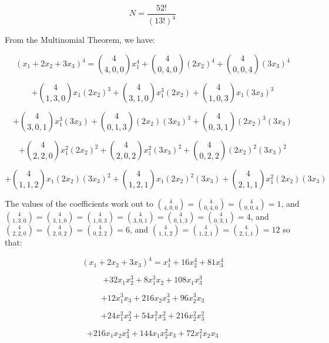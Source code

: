 \documentclass[a4paper,12pt]{article}
\begin{document}
\[ N = \frac{52!}{(13!)^4} \]

\pagebreak
{}

From the Multinomial Theorem, we have:

\[ (x_1 + 2x_2 + 3x_3)^4 = \binom{4}{4,0,0}x_1^4 + \binom{4}{0,4,0}(2x_2)^4 + \binom{4}{0,0,4}(3x_3)^4 \]

\[ + \binom{4}{1,3,0}x_1 (2x_2)^3 + \binom{4}{3,1,0}x_1^3 (2x_2) + \binom{4}{1,0,3}x_1(3x_3)^3 \]

\[ + \binom{4}{3,0,1}x_1^3(3x_3) + \binom{4}{0,1,3}(2x_2)(3x_3)^3 + \binom{4}{0,3,1}(2x_2)^3 (3x_3) \]

\[ +\binom{4}{2,2,0}x_1^2(2x_2)^2 + \binom{4}{2,0,2}x_1^2(3x_3)^2 + \binom{4}{0,2,2}(2x_2)^2(3x_3)^2 \]

\[ + \binom{4}{1,1,2}x_1 (2x_2) (3x_3)^2+ \binom{4}{1,2,1}x_1(2x_2)^2(3x_3) + \binom{4}{2,1,1}x_1^2(2x_2)(3x_3) \]

\vspace{2mm}
The values of the coefficients work out to $\binom{4}{4,0,0} = \binom{4}{0,4,0} = \binom{4}{0,0,4} = 1$, and $\binom{4}{1,3,0} = \binom{4}{3,1,0} = \binom{4}{1,0,3} = \binom{4}{3,0,1} = \binom{4}{0,1,3} =  \binom{4}{0,3,1} = 4$, and $\binom{4}{2,2,0} = \binom{4}{2,0,2} = \binom{4}{0,2,2} = 6$, and $\binom{4}{1,1,2} = \binom{4}{1,2,1} = \binom{4}{2,1,1} = 12$ so that:

\[ (x_1 + 2x_2 + 3x_3)^4 = x_1^4 + 16x_2^4 + 81x_3^4 \]

\[ + 32 x_1 x_2^3 + 8x_1^3x_2 + 108x_1x_3^3 \]

\[ + 12x_1^3x_3 + 216x_2x_3^3 + 96x_2^3x_3\]

\[ + 24x_1^2x_2^2 + 54x_1^2x_3^2 + 216x_2^2 x_3^2 \]

\[ +216 x_1 x_2 x_3^2 + 144x_1 x_2^2 x_3 + 72x_1^2 x_2 x_3 \]

\pagebreak
{}
\end{document}
